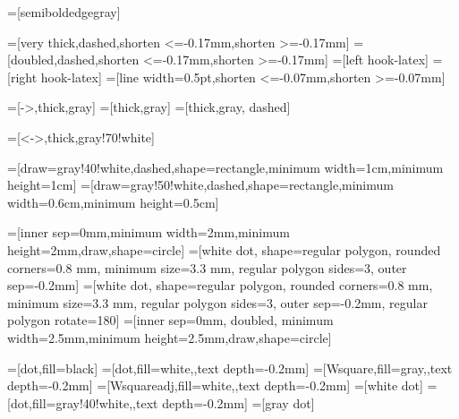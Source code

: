 =[semiboldedgegray]

=[very thick,dashed,shorten <=-0.17mm,shorten >=-0.17mm]
=[doubled,dashed,shorten <=-0.17mm,shorten >=-0.17mm]
=[left hook-latex]
=[right hook-latex]
=[line width=0.5pt,shorten <=-0.07mm,shorten >=-0.07mm]

=[->,thick,gray]
=[thick,gray]
=[thick,gray, dashed]

=[<->,thick,gray!70!white]

=[draw=gray!40!white,dashed,shape=rectangle,minimum width=1cm,minimum height=1cm]
=[draw=gray!50!white,dashed,shape=rectangle,minimum width=0.6cm,minimum height=0.5cm]

\newcommand{\measurement}{\tikz[scale=0.6]{ \draw [use as bounding box,draw=none] (0,-0.1) rectangle (1,0.7); \draw [fill=white] (1,0) arc (0:180:5mm); \draw (0,0) -- (1,0) (0.5,0) -- +(60:7mm);}}  


=[inner sep=0mm,minimum width=2mm,minimum height=2mm,draw,shape=circle]  
=[white dot, shape=regular polygon, rounded corners=0.8 mm, minimum size=3.3 mm, regular polygon sides=3, outer sep=-0.2mm]
=[white dot, shape=regular polygon, rounded corners=0.8 mm, minimum size=3.3 mm, regular polygon sides=3, outer sep=-0.2mm, regular polygon rotate=180]
=[inner sep=0mm, doubled, minimum width=2.5mm,minimum height=2.5mm,draw,shape=circle]

=[dot,fill=black]
=[dot,fill=white,,text depth=-0.2mm]
=[Wsquare,fill=gray,,text depth=-0.2mm]
=[Wsquareadj,fill=white,,text depth=-0.2mm]
=[white dot] %
=[dot,fill=gray!40!white,,text depth=-0.2mm]
=[gray dot] %


